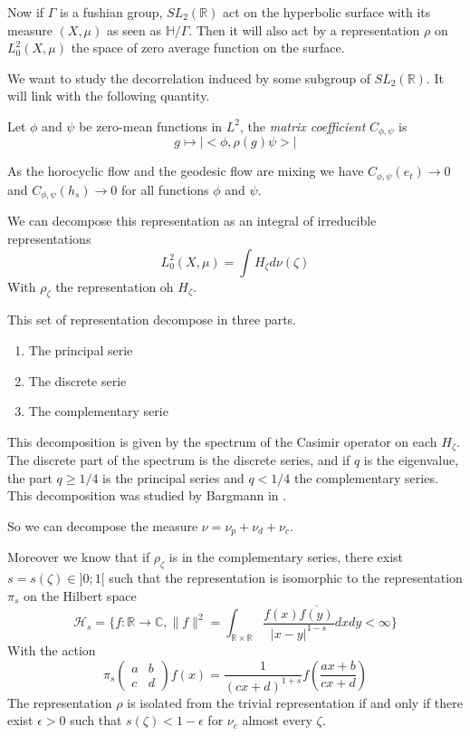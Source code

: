 Now if $\Gamma$ is a fushian group, $SL_2(\mathbb{R})$ act on the hyperbolic surface with its measure $(X,\mu)$ as seen as $\mathbb{H}/ \Gamma$.
Then it will also act by a representation $\rho$ on $L^2_0(X,\mu)$ the space of zero average function on the surface.

We want to study the decorrelation induced by some subgroup of $SL_2(\mathbb{R})$. It will link with the following quantity.

\begin{dfnt}
Let $\phi$ and $\psi$ be zero-mean functions in $L^2$, the \emph{matrix coefficient} $C_{\phi,\psi}$ is\[
g \mapsto |<\phi, \rho(g) \psi>|
\]
\end{dfnt}

\begin{rmq}
As the horocyclic flow and the geodesic flow are mixing we have $C_{\phi,\psi}(e_t) \to 0$ and $C_{\phi,\psi}(h_s) \to 0$ for all functions $\phi$ and $\psi$.
\end{rmq}

We can decompose this representation as an integral of irreducible representations \[
L^2_0(X,\mu)=\int H_\zeta d \nu(\zeta)
\]
With $\rho_{\zeta}$ the representation oh $H_{\zeta}$.

This set of representation decompose in three parts. \begin{enumerate}
\item The principal serie
\item The discrete serie
\item The complementary serie
\end{enumerate}

This decomposition is given by the spectrum of the Casimir operator on each $H_\zeta$.
The discrete part of the spectrum is the discrete series, and if $q$ is the eigenvalue, the part $q \geq 1/4$ is the principal series and $q < 1/4$ the complementary series. This decomposition was studied by Bargmann in \cite{10.2307/1969129}.

So we can decompose the measure $\nu=\nu_p + \nu_d + \nu_c$.

Moreover we know that if $\rho_\zeta$ is in the complementary series, there exist $s=s(\zeta) \in ]0;1[$ such that the representation is isomorphic to the representation $\pi_s$ on the Hilbert space \[
\mathcal{H}_s =
\{ f:\mathbb{R} \to \mathbb{C}
, \|f \|^2 = \int_{\mathbb{R} \times \mathbb{R}}
 \frac{f(x) \overline{f(y)}}{|x-y|^{1-s}}dxdy < \infty\}
\]
With the action \[
\pi_s \begin{pmatrix}a & b \\c & d \end{pmatrix}f(x)=\frac{1}{(cx+d)^{1+s}}f(\frac{ax+b}{cx+d})
\]
The representation $\rho$ is isolated from the trivial representation if and only if there exist $\epsilon >0$ such that $s(\zeta)<1-\epsilon$ for $\nu_c$ almost every $\zeta$.


